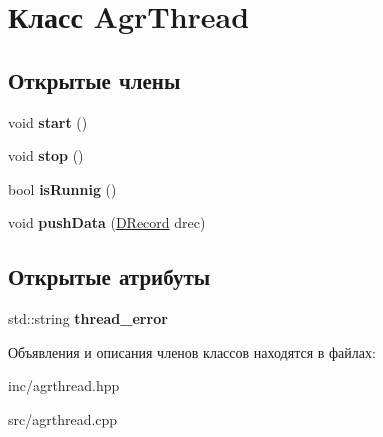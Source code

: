 \hypertarget{classAgrThread}{}\section{Класс Agr\+Thread}
\label{classAgrThread}
\subsection*{Открытые члены}
\begin{DoxyCompactItemize}
\item 
\mbox{\label{classAgrThread_a07b79d54e13b03b897ad4eea3a08be48}} 
void {\bfseries start} ()
\item 
\mbox{\label{classAgrThread_a397784806cf6626354df281f3059cb48}} 
void {\bfseries stop} ()
\item 
\mbox{\label{classAgrThread_a7389f81260267964c9e3f2a46591796f}} 
bool {\bfseries is\+Runnig} ()
\item 
\mbox{\label{classAgrThread_ae74c254588045b58cfc737840dd8a66d}} 
void {\bfseries push\+Data} (\hyperlink{classDRecord}{D\+Record} drec)
\end{DoxyCompactItemize}
\subsection*{Открытые атрибуты}
\begin{DoxyCompactItemize}
\item 
\mbox{\label{classAgrThread_ac0b7bb78255a6ca26ed1af3ab9b48a69}} 
std\+::string {\bfseries thread\+\_\+error}
\end{DoxyCompactItemize}


Объявления и описания членов классов находятся в файлах\+:\begin{DoxyCompactItemize}
\item 
inc/agrthread.\+hpp\item 
src/agrthread.\+cpp\end{DoxyCompactItemize}
